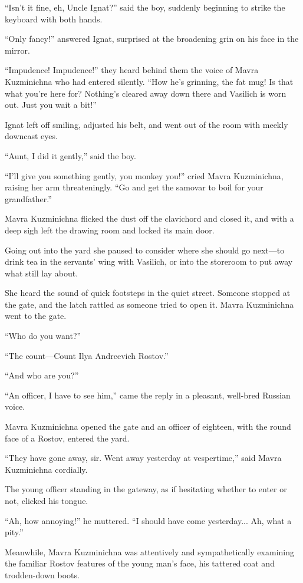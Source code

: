 ``Isn't it fine, eh, Uncle Ignat?'' said the boy, suddenly
beginning to strike the keyboard with both hands.

``Only fancy!'' answered Ignat, surprised at the broadening grin
on his face in the mirror.

``Impudence! Impudence!'' they heard behind them the voice of
Mavra Kuzminichna who had entered silently. ``How he's grinning,
the fat mug!  Is that what you're here for? Nothing's cleared
away down there and Vasilich is worn out. Just you wait a bit!''

Ignat left off smiling, adjusted his belt, and went out of the
room with meekly downcast eyes.

``Aunt, I did it gently,'' said the boy.

``I'll give you something gently, you monkey you!'' cried Mavra
Kuzminichna, raising her arm threateningly. ``Go and get the
samovar to boil for your grandfather.''

Mavra Kuzminichna flicked the dust off the clavichord and closed
it, and with a deep sigh left the drawing room and locked its
main door.

Going out into the yard she paused to consider where she should
go next---to drink tea in the servants' wing with Vasilich, or
into the storeroom to put away what still lay about.

She heard the sound of quick footsteps in the quiet
street. Someone stopped at the gate, and the latch rattled as
someone tried to open it.  Mavra Kuzminichna went to the gate.

``Who do you want?''

``The count---Count Ilya Andreevich Rostov.''

``And who are you?''

``An officer, I have to see him,'' came the reply in a pleasant,
well-bred Russian voice.

Mavra Kuzminichna opened the gate and an officer of eighteen,
with the round face of a Rostov, entered the yard.

``They have gone away, sir. Went away yesterday at vespertime,''
said Mavra Kuzminichna cordially.

The young officer standing in the gateway, as if hesitating
whether to enter or not, clicked his tongue.

``Ah, how annoying!'' he muttered. ``I should have come
yesterday... Ah, what a pity.''

Meanwhile, Mavra Kuzminichna was attentively and sympathetically
examining the familiar Rostov features of the young man's face,
his tattered coat and trodden-down boots.


